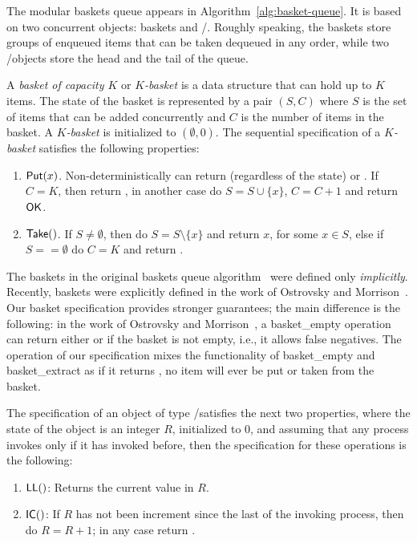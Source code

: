 The modular baskets queue appears in Algorithm~\ref{alg:basket-queue}. It is based on two concurrent objects: baskets and \LL/\IC. Roughly speaking, the baskets store groups of enqueued items that can be taken dequeued in any order, while two \LL/\IC objects store the head and the tail of the queue.

\begin{definition}[\(K\)-Basket]
A \emph{basket of capacity $K$} or \emph{$K$-basket} is a data structure that can hold up to $K$ items. The state of the basket is represented by a pair $(S, C)$ where $S$ is the set of items that can be added concurrently and $C$ is the number of items in the basket. A \emph{$K$-basket} is initialized to $(\emptyset, 0)$. The sequential specification of a \emph{$K$-basket} satisfies the following properties:

\begin{enumerate}
    \item ${\sf Put}(x)$. Non-deterministically can return \full (regardless of the state) or \ok. If $C = K$, then return \full, in another case do $S = S \cup \{x\}$, $C = C +1$ and return ${\sf OK}$.
    \item ${\sf Take}()$. If $S \neq \emptyset$, then do $S = S \setminus \{x\}$ and return $x$, for some $x \in S$, else if $S == \emptyset$ do $C = K$ and return \closed.
\end{enumerate}
\end{definition}

The baskets in the original baskets queue algorithm~\cite{basketqueue2007} were defined only \emph{implicitly}. Recently, baskets were explicitly defined in the work of Ostrovsky and Morrison~\cite{scalingconcurrent2020}. Our basket specification provides stronger guarantees; the main difference is the following: in the work of Ostrovsky and Morrison~\cite{scalingconcurrent2020}, a {\sf basket\_empty} operation can return either \true or \false if the basket is not empty, i.e., it allows false negatives. The \Take operation of our specification mixes the functionality of {\sf basket\_empty} and {\sf basket\_extract} as if it returns \closed, no item will ever be put or taken from the basket.

\begin{definition}
    The specification of an object of type \LL/\IC satisfies the next two properties, where the state of the object is an integer $R$, initialized to 0, and assuming that any process invokes \IC only if it has invoked \LL before, then the specification for these operations is the following:

    \begin{enumerate}
    \item ${\sf LL}()$: Returns the current value in $R$.
    \item ${\sf IC}()$: If $R$ has not been increment since the last \LL of the invoking process,
    then do $R = R + 1$; in any case return \ok.
    \end{enumerate}
\end{definition}

